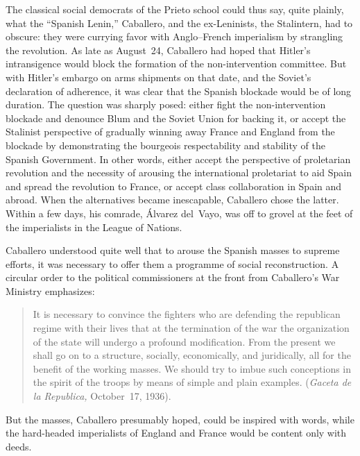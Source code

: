 The classical social democrats of the Prieto school could thus say, quite plainly, what the ``Spanish Lenin,'' Caballero, and the ex-Len\-in\-ists, the Stalintern, had to obscure: they were currying favor with Anglo--French imperialism by strangling the revolution. As late as August~24, Caballero had hoped that Hitler’s intransigence would block the formation of the non-intervention committee. But with Hitler’s embargo on arms shipments on that date, and the Soviet’s declaration of adherence, it was clear that the Spanish blockade would be of long duration. The question was sharply posed: either fight the non-intervention blockade and denounce Blum and the Soviet Union for backing it, or accept the Stalinist perspective of gradually winning away France and England from the blockade by demonstrating the bourgeois respectability and stability of the Spanish Government. In other words, either accept the perspective of proletarian revolution and the necessity of arousing the international proletariat to aid Spain and spread the revolution to France, or accept class collaboration in Spain and abroad. When the alternatives became inescapable, Caballero chose the latter. Within a few days, his comrade, \'Alvarez del~Vayo, was off to grovel at the feet of the imperialists in the League of Nations.

Caballero understood quite well that to arouse the Spanish masses to supreme efforts, it was necessary to offer them a programme of social reconstruction. A circular order to the political commissioners at the front from Caballero’s War Ministry emphasizes:

\begin{quotation}
  It is necessary to convince the fighters who are defending the republican regime with their lives that at the termination of the war the organization of the state will undergo a profound modification. From the present we shall go on to a structure, socially, economically, and juridically, all for the benefit of the working masses. We should try to imbue such conceptions in the spirit of the troops by means of simple and plain examples. (\emph{Gaceta de la Republica,} October~17, 1936).
\end{quotation}

\begin{sloppypar}
  But the masses, Caballero presumably hoped, could be inspired with words, while the hard-headed imperialists of England and France would be content only with deeds.
\end{sloppypar}

